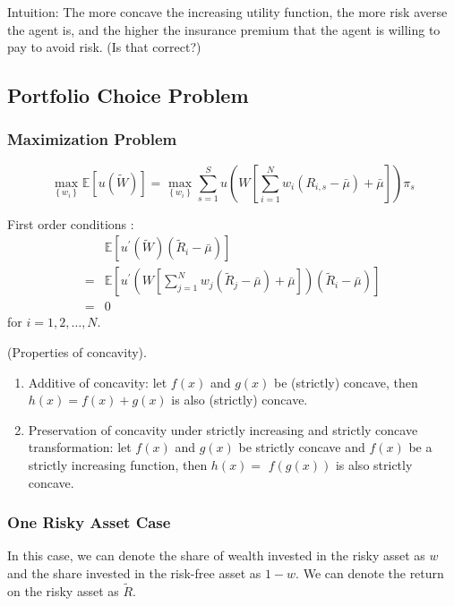 \documentclass[10pt]{article}
\begin{document}
Intuition: 
The more concave the increasing utility function, the more risk averse the agent is, and the higher the insurance premium that the agent is willing to pay to avoid risk.
(Is that correct?)

\subsection{Portfolio Choice Problem}

\subsubsection{Maximization Problem}

$$
\max _{\left\{w_i\right\}} \mathbb{E}[u(\tilde{W})]=\max _{\left\{w_i\right\}}\sum_{s=1}^S u\left(W\left[\sum_{i=1}^N w_i\left(R_{i, s}-\bar{\mu}\right)+\bar{\mu}\right]\right) \pi_s
$$

First order conditions :
$$
\begin{aligned}
& \mathbb{E}\left[u^{\prime}(\tilde{W})\left(\tilde{R}_i-\bar{\mu}\right)\right]  \\
= & \mathbb{E}\left[u^{\prime}\left(W\left[\sum_{j=1}^N w_j\left(\tilde{R}_j-\bar{\mu}\right)+\bar{\mu}\right]\right)\left(\tilde{R}_i-\bar{\mu}\right)\right] \\
= & 0
\end{aligned}
$$
for $i=1,2, \ldots, N$.

\begin{lemma}
    (Properties of concavity).

    \begin{enumerate}
        \item Additive of concavity: let $f(x)$ and $g(x)$ be (strictly) concave, then $h(x)=f(x)+g(x)$ is also (strictly) concave.
        \item Preservation of concavity under strictly increasing and
            strictly concave transformation: 
            let $f(x)$ and $g(x)$ be strictly concave and $f(x)$ be a strictly increasing function, then $h(x)=$ $f(g(x))$ is also strictly concave.
    \end{enumerate}

\end{lemma}

\subsubsection{One Risky Asset Case}

In this case, we can denote the share of wealth 
invested in the risky asset as $w$
and the share invested in the risk-free asset as $1-w$.
We can denote the return on the risky asset as $\tilde{R}$.
\end{document}
